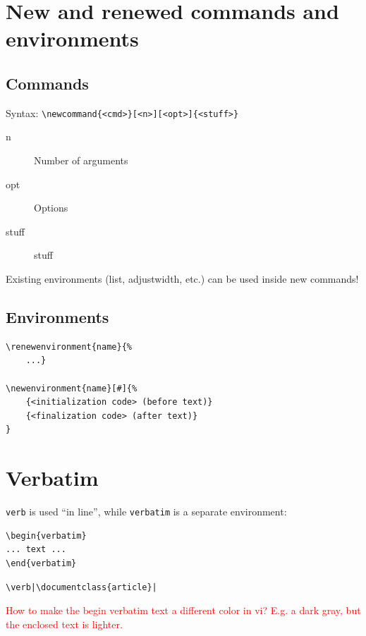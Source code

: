 \documentclass{article}
\begin{document}
\section{New and renewed commands and environments}
\subsection{Commands}
Syntax: \verb|\newcommand{<cmd>}[<n>][<opt>]{<stuff>}|
\begin{description}
    \item [n] Number of arguments
    \item [opt] Options
    \item [stuff] stuff
\end{description}
Existing environments (list, adjustwidth, etc.) can be used inside new
commands!

\subsection{Environments}
\begin{verbatim}
\renewenvironment{name}{%
    ...}

\newenvironment{name}[#]{%
    {<initialization code> (before text)}
    {<finalization code> (after text)}
}
\end{verbatim}


\section{Verbatim}
\texttt{verb} is used ``in line'', while \texttt{verbatim} is a separate
environment:
\begin{lstlisting}
\begin{verbatim}
... text ...
\end{verbatim}
\end{lstlisting}

\begin{verbatim}
\verb|\documentclass{article}|
\end{verbatim}
\textcolor{red}{How to make the begin verbatim text a different color
in vi? E.g. a dark gray, but the enclosed text is lighter.}
\end{document}
